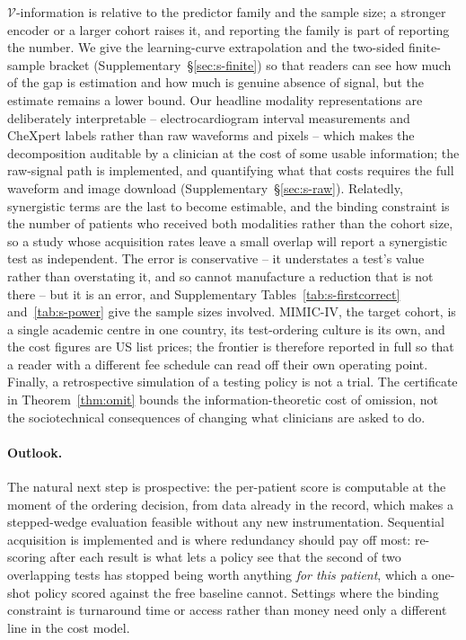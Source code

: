 \documentclass[11pt]{article}
\theoremstyle{definition}
\theoremstyle{remark}
\newcommand{\Vc}{\mathcal{V}}
\begin{document}
$\Vc$-information is relative to the predictor family
and the sample size; a stronger encoder or a larger cohort raises it, and
reporting the family is part of reporting the number. We give the learning-curve
extrapolation and the two-sided finite-sample bracket (Supplementary~\S\ref{sec:s-finite}) so that
readers can see how much of the gap is estimation and how much is genuine
absence of signal, but the estimate remains a lower bound. Our headline
modality representations are deliberately interpretable -- electrocardiogram
interval measurements and CheXpert labels rather than raw waveforms and pixels --
which makes the decomposition auditable by a clinician at the cost of some
usable information; the raw-signal path is implemented, and quantifying what
that costs requires the full waveform and image download (Supplementary~\S\ref{sec:s-raw}).
Relatedly, synergistic terms are the last to become estimable, and the binding
constraint is the number of patients who received both modalities rather than
the cohort size, so a study whose acquisition rates leave a small overlap will
report a synergistic test as independent. The error is conservative -- it
understates a test's value rather than overstating it, and so cannot manufacture
a reduction that is not there -- but it is an error, and Supplementary
Tables~\ref{tab:s-firstcorrect} and~\ref{tab:s-power} give the sample sizes involved. MIMIC-IV, the target cohort, is
a single academic centre in one country, its test-ordering culture is its own,
and the cost figures are US list prices; the frontier is therefore reported in full so that a reader with a
different fee schedule can read off their own operating point. Finally, a
retrospective simulation of a testing policy is not a trial. The certificate in
Theorem~\ref{thm:omit} bounds the information-theoretic cost of omission, not
the sociotechnical consequences of changing what clinicians are asked to do.

\paragraph{Outlook.} The natural next step is prospective: the per-patient score
is computable at the moment of the ordering decision, from data already in the
record, which makes a stepped-wedge evaluation feasible without any new
instrumentation. Sequential acquisition is implemented and is where redundancy
should pay off most: re-scoring after each result is what lets a policy see that
the second of two overlapping tests has stopped being worth anything \emph{for
this patient}, which a one-shot policy scored against the free baseline cannot.
Settings where the binding constraint is turnaround time or access rather than
money need only a different line in the cost model.
\end{document}
